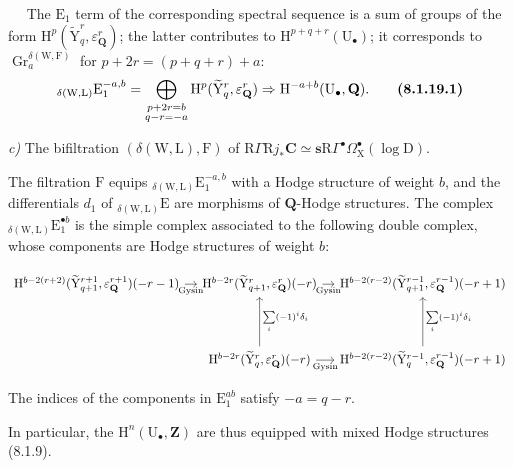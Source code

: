 \documentclass[11pt,leqno]{article}
\newcommand{\Page}[1]{\ifvmode\noindent\else\unskip\ \fi{\footnotesize\textcolor{gray}{[p.\,#1]}}\ \ignorespaces}
\begin{document}
\Page{35}
The \(\mathrm{E}_{1}\) term of the corresponding spectral sequence is a sum of groups of the form \(\mathrm{H}^{p}(\widetilde{\mathrm{Y}}_{q}^{r},\varepsilon_{\mathbf{Q}}^{r})\); the latter contributes to \(\mathrm{H}^{p+q+r}(\mathrm{U}_{\bullet})\); it corresponds to \(\operatorname{Gr}_{a}^{\delta(\mathrm{W},\mathrm{F})}\) for \(p+2r=(p+q+r)+a\):
\[
{}_{\delta(\mathrm{W},\mathrm{L})}\mathrm{E}_{1}^{-a,b}
=
\bigoplus_{\substack{p+2r=b\\q-r=-a}}
\mathrm{H}^{p}(\widetilde{\mathrm{Y}}_{q}^{r},\varepsilon_{\mathbf{Q}}^{r})
\Rightarrow
\mathrm{H}^{-a+b}(\mathrm{U}_{\bullet},\mathbf{Q}).
\tag*{\textbf{(8.1.19.1)}}
\]

\textit{c)} The bifiltration \((\delta(\mathrm{W},\mathrm{L}),\mathrm{F})\) of \(\mathrm{R}\Gamma\mathrm{R}j_{\ast}\mathbf{C}\simeq\mathbf{s}\mathrm{R}\Gamma^\bullet\Omega_{\mathrm{X}}^\bullet(\log\mathrm{D})\).

The filtration \(\mathrm{F}\) equips \({}_{\delta(\mathrm{W},\mathrm{L})}\mathrm{E}_{1}^{-a,b}\) with a Hodge structure of weight \(b\), and the differentials \(d_{1}\) of \({}_{\delta(\mathrm{W},\mathrm{L})}\mathrm{E}\) are morphisms of \(\mathbf{Q}\)-Hodge structures. The complex \({}_{\delta(\mathrm{W},\mathrm{L})}\mathrm{E}_{1}^{\bullet b}\) is the simple complex associated to the following double complex, whose components are Hodge structures of weight \(b\):

{\small
\[
\begin{tikzcd}[ampersand replacement=\&, column sep=1em, row sep=4em]
\mathrm{H}^{b-2(r+2)}
(\widetilde{\mathrm{Y}}_{q+1}^{r+1},\varepsilon_{\mathbf{Q}}^{r+1})(-r-1)
\arrow[r, "\mathrm{Gysin}"']
\&
\mathrm{H}^{b-2r}
(\widetilde{\mathrm{Y}}_{q+1}^{r},\varepsilon_{\mathbf{Q}}^{r})(-r)
\arrow[r, "\mathrm{Gysin}"']
\&
\mathrm{H}^{b-2(r-2)}
(\widetilde{\mathrm{Y}}_{q+1}^{r-1},\varepsilon_{\mathbf{Q}}^{r-1})(-r+1)
\\
\&
\mathrm{H}^{b-2r}
(\widetilde{\mathrm{Y}}_{q}^{r},\varepsilon_{\mathbf{Q}}^{r})(-r)
\arrow[u, "{\sum\limits_i(-1)^i\delta_i}"']
\arrow[r, "\mathrm{Gysin}"']
\&
\mathrm{H}^{b-2(r-2)}
(\widetilde{\mathrm{Y}}_{q}^{r-1},\varepsilon_{\mathbf{Q}}^{r-1})(-r+1)
\arrow[u, "{\sum\limits_i(-1)^i\delta_i}"']
\end{tikzcd}
\]
}

The indices of the components in \(\mathrm{E}_{1}^{ab}\) satisfy \(-a=q-r\).

In particular, the \(\mathrm{H}^{n}(\mathrm{U}_{\bullet},\mathbf{Z})\) are thus equipped with mixed Hodge structures (8.1.9).
\end{document}
